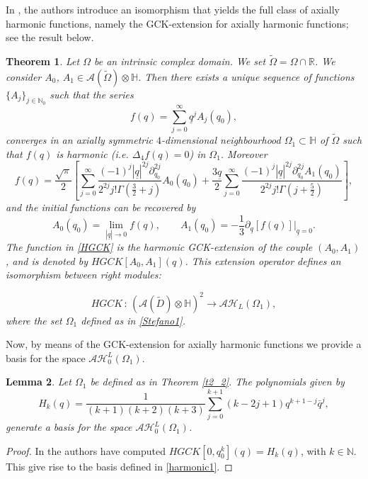 \documentclass[reqno,11pt]{amsart}
\numberwithin{equation}{section}
\newtheorem{theorem}{Theorem}[section]
\newtheorem{lemma}[theorem]{Lemma}
\theoremstyle{definition}
\begin{document}
In \cite[Thm. 3.1]{DG}, the authors introduce an isomorphism that yields the full class of axially harmonic functions, namely the GCK-extension for axially harmonic functions; see the result below.

\begin{theorem}
Let $\Omega$ be an intrinsic complex domain. We set $\tilde{\Omega}=\Omega \cap \mathbb{R}$. We consider $A_0$, $A_1 \in \mathcal{A}(\tilde{\Omega}) \otimes \mathbb{H}$. Then there exists a unique sequence of functions $ \{A_j\}_{j \in \mathbb{N}_0}$ such that the series
$$ f(q)= \sum_{j=0}^{\infty} \underline{q}^j A_j(q_0),$$
converges in an axially symmetric $4$-dimensional neighbourhood $\Omega_1 \subset \mathbb{H}$ of $\tilde{\Omega}$ such that $f(q)$ is harmonic (i.e. $\Delta_4 f(q)=0$) in $\Omega_1$. Moreover
\begin{equation}
\label{HGCK}
f(q)= \frac{\sqrt{\pi}}{2} \left[\sum_{j=0}^\infty  \frac{(-1)^j | \underline{q}|^{2j} \partial_{q_0}^{2j}}{2^{2j}j! \Gamma \left(\frac{3}{2}+j\right)}A_0(q_0)+ \frac{3 \underline{q}}{2} \sum_{j=0}^\infty  \frac{(-1)^j | \underline{q}|^{2j} \partial_{q_0}^{2j}A_1(q_0)}{2^{2j}j! \Gamma\left(j+\frac{5}{2}\right)}\right],
\end{equation}
and the initial functions can be recovered by
$$ A_0(q_0)= \lim_{|\underline{q}| \to 0} f(q), \qquad A_1(q_0)= -\frac{1}{3} \partial_{\underline{q}}[f(q)]|_{\underline{q}=0}.$$
The function in \eqref{HGCK} is the harmonic GCK-extension of the couple $(A_0,A_1)$, and is denoted by $HGCK[A_0, A_1](q)$. This extension operator defines an isomorphism between right modules:

$$ HGCK \, : \, \left(\mathcal{A}(\tilde{D}) \otimes \mathbb{H}\right)^2 \to \mathcal{AH}_L(\Omega_1),$$
where the set $\Omega_1$ defined as in \eqref{Stefano1}.
\end{theorem}

Now, by means of the GCK-extension for axially harmonic functions we provide a basis for the space $ \mathcal{AH}_0^L(\Omega_1)$.

\begin{lemma}
\label{appH1}
Let $\Omega_1$ be defined as in Theorem \ref{t2_2}. The polynomials given by
\begin{equation}
\label{harmonic1}
H_k(q)= \frac{1}{(k+1)(k+2)(k+3)} \sum_{j=0}^{k+1} (k-2j+1) q^{k+1-j} \bar{q}^j,
\end{equation}
generate a basis for the space $ \mathcal{AH}_0^L(\Omega_1)$.
\end{lemma}
\begin{proof}
In \cite[Prop. 6.13]{DG} the authors have computed $HGCK[0, q_0^k](q)=H_k(q)$, with $k \in \mathbb{N}$. This give rise to the basis defined in \eqref{harmonic1}.
\end{proof}
\end{document}
